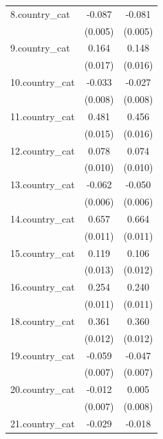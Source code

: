 \begin{table}[htbp]
\begin{tabular}{l cc}
\addlinespace
8.country\_cat&      -0.087\sym{***}&      -0.081\sym{***}\\
            &     (0.005)         &     (0.005)         \\
\addlinespace
9.country\_cat&       0.164\sym{***}&       0.148\sym{***}\\
            &     (0.017)         &     (0.016)         \\
\addlinespace
10.country\_cat&      -0.033\sym{***}&      -0.027\sym{***}\\
            &     (0.008)         &     (0.008)         \\
\addlinespace
11.country\_cat&       0.481\sym{***}&       0.456\sym{***}\\
            &     (0.015)         &     (0.016)         \\
\addlinespace
12.country\_cat&       0.078\sym{***}&       0.074\sym{***}\\
            &     (0.010)         &     (0.010)         \\
\addlinespace
13.country\_cat&      -0.062\sym{***}&      -0.050\sym{***}\\
            &     (0.006)         &     (0.006)         \\
\addlinespace
14.country\_cat&       0.657\sym{***}&       0.664\sym{***}\\
            &     (0.011)         &     (0.011)         \\
\addlinespace
15.country\_cat&       0.119\sym{***}&       0.106\sym{***}\\
            &     (0.013)         &     (0.012)         \\
\addlinespace
16.country\_cat&       0.254\sym{***}&       0.240\sym{***}\\
            &     (0.011)         &     (0.011)         \\
\addlinespace
18.country\_cat&       0.361\sym{***}&       0.360\sym{***}\\
            &     (0.012)         &     (0.012)         \\
\addlinespace
19.country\_cat&      -0.059\sym{***}&      -0.047\sym{***}\\
            &     (0.007)         &     (0.007)         \\
\addlinespace
20.country\_cat&      -0.012\sym{*}  &       0.005         \\
            &     (0.007)         &     (0.008)         \\
\addlinespace
21.country\_cat&      -0.029\sym{***}&      -0.018\sym{***}\\

\end{tabular}
\end{table}
